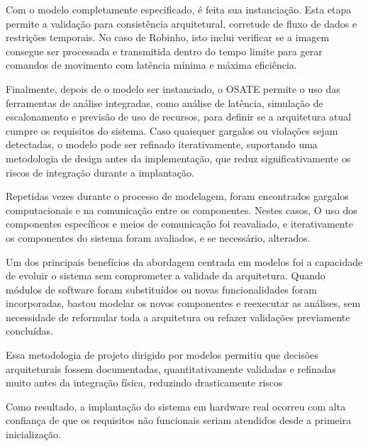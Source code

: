 Com o modelo completamente especificado, é feita sua instanciação. Esta etapa permite a  validação para consistência arquitetural, corretude de fluxo de dados e restrições temporais. No caso de Robinho, isto inclui verificar se a imagem consegue ser processada e transmitida dentro do tempo limite para gerar comandos de movimento com latência mínima e máxima eficiência.

Finalmente, depois de o modelo ser instanciado, o OSATE permite o uso das ferramentas de análise integradas, como análise de latência, simulação de escalonamento e previsão de uso de recursos, para definir se a arquitetura atual cumpre os requisitos do sistema. Caso quaisquer gargalos ou violações sejam detectadas, o modelo pode ser refinado iterativamente, suportando uma metodologia de design antes da implementação, que reduz significativamente os riscos de integração durante a implantação.

Repetidas vezes durante o processo de modelagem, foram encontrados gargalos computacionais e na comunicação entre os componentes. Nestes casos, O uso dos componentes específicos e meios de comunicação foi reavaliado, e iterativamente os componentes do sistema foram avaliados, e se necessário, alterados.

Um dos principais benefícios da abordagem centrada em modelos foi a capacidade de evoluir o sistema sem comprometer a validade da arquitetura. Quando módulos de software foram substituídos ou novas funcionalidades foram incorporadas, bastou modelar os novos componentes e reexecutar as análises, sem necessidade de reformular toda a arquitetura ou refazer validações previamente concluídas.

Essa metodologia de projeto dirigido por modelos permitiu que decisões arquiteturais fossem documentadas, quantitativamente validadas e refinadas muito antes da integração física, reduzindo drasticamente riscos

Como resultado, a implantação do sistema em hardware real ocorreu com alta confiança de que os requisitos não funcionais seriam atendidos desde a primeira inicialização.